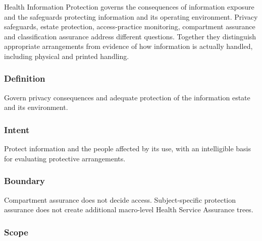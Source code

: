 Health Information Protection governs the consequences of information exposure and the safeguards protecting information and its operating environment. Privacy safeguards, estate protection, access-practice monitoring, compartment assurance and classification assurance address different questions. Together they distinguish appropriate arrangements from evidence of how information is actually handled, including physical and printed handling.

\subsubsection*{Definition}

Govern privacy consequences and adequate protection of the information estate and its environment.

\subsubsection*{Intent}

Protect information and the people affected by its use, with an intelligible basis for evaluating protective arrangements.

\subsubsection*{Boundary}

Compartment assurance does not decide access. Subject-specific protection assurance does not create additional macro-level Health Service Assurance trees.

\subsubsection*{Scope}
